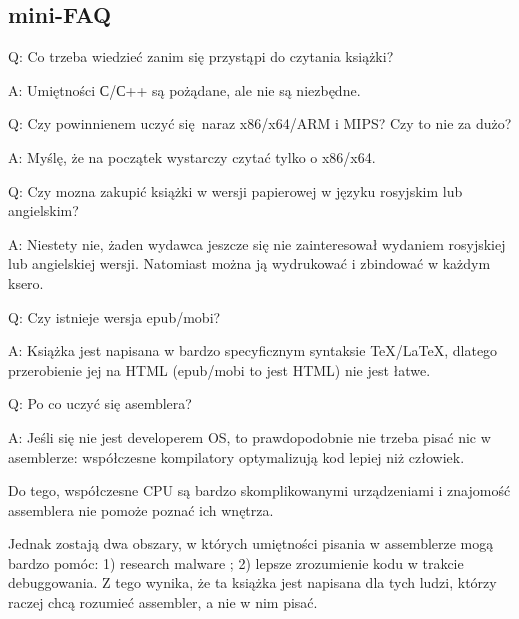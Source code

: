 \subsection*{mini-FAQ}


\par Q: Co trzeba wiedzieć zanim się przystąpi do czytania książki?
\par A: Umiętności С/С++ są pożądane, ale nie są niezbędne.

\par Q: Czy powinnienem uczyć się naraz x86/x64/ARM i MIPS? Czy to nie za dużo?
\par A: Myślę, że na początek wystarczy czytać tylko o x86/x64.

\par Q: Czy mozna zakupić książki w wersji papierowej w języku rosyjskim lub angielskim?
\par A: Niestety nie, żaden wydawca jeszcze się nie zainteresował wydaniem rosyjskiej lub angielskiej wersji. Natomiast można ją wydrukować i zbindować w każdym ksero.

\par Q: Czy istnieje wersja epub/mobi?
\par A: Książka jest napisana w bardzo specyficznym syntaksie TeX/LaTeX, dlatego przerobienie jej na HTML (epub/mobi to jest HTML)
nie jest łatwe.

\par Q: Po co uczyć się asemblera?
\par A: Jeśli się nie jest developerem \ac{OS}, to prawdopodobnie nie trzeba pisać nic w asemblerze: współczesne kompilatory optymalizują kod lepiej niż człowiek.

Do tego, współczesne \ac{CPU} są bardzo skomplikowanymi urządzeniami i znajomość assemblera nie pomoże poznać ich wnętrza.

Jednak zostają dwa obszary, w których umiętności pisania w assemblerze mogą bardzo pomóc:
1) research malware ; 2) lepsze zrozumienie kodu w trakcie debuggowania.
Z tego wynika, że ta książka jest napisana dla tych ludzi, którzy raczej chcą rozumieć assembler, a nie w nim pisać.

